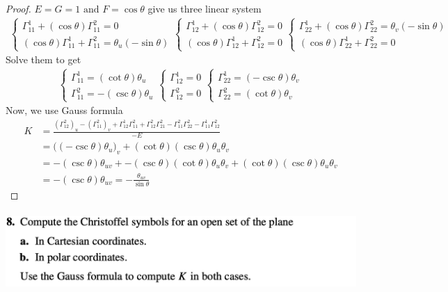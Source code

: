 \documentclass{report}
\begin{document}
\begin{proof}
$E=G=1\text{ and }F=\cos \theta$ give us three linear system 
\begin{align*}
\begin{cases}
  \Gamma^1_{11}+ (\cos \theta) \Gamma^2_{11}=0\\
  (\cos \theta) \Gamma^1_{11} + \Gamma^2_{11}= \theta_u (- \sin \theta)
\end{cases} \begin{cases}
  \Gamma^1_{12}+ (\cos \theta) \Gamma^2_{12}=0 \\
  (\cos \theta) \Gamma^1_{12}+ \Gamma^2_{12}= 0
\end{cases} \begin{cases}
 \Gamma^1_{22}+ (\cos \theta) \Gamma^2_{22}= \theta _v (-\sin \theta)  \\
 (\cos \theta)\Gamma^1_{22} + \Gamma^2_{22}=0
\end{cases}
\end{align*}
Solve them to get 
\begin{align*}
\begin{cases}
  \Gamma^1_{11}= (\cot \theta)\theta_u \\
  \Gamma^2_{11}=- (\csc \theta)\theta_u
\end{cases} \begin{cases}
  \Gamma^1_{12}=0\\
  \Gamma^2_{12}=0
\end{cases} \begin{cases}
  \Gamma^1_{22}= (- \csc \theta)\theta _v\\
  \Gamma^2_{22}=(\cot \theta )\theta_v
\end{cases}
\end{align*}
Now, we use Gauss formula 
\begin{align*}
K&= \frac{(\Gamma ^2_{12})_u - (\Gamma^2_{11})_v + \Gamma^1_{12} \Gamma^2_{11} + \Gamma^2_{12}\Gamma^2_{21}- \Gamma^2_{11}\Gamma^2_{22}-\Gamma^1_{11}\Gamma^2_{12}}{-E}\\
&= \big((-\csc \theta)\theta_u\big)_v + (\cot  \theta )(\csc \theta) \theta_u \theta_v\\
&= -(\csc \theta) \theta_{uv} + - (\csc \theta)(\cot \theta) \theta_u \theta_v + (\cot \theta)(\csc \theta)\theta_u \theta_v  \\
&= - (\csc \theta) \theta_{uv}= -\frac{\theta_{uv}}{\sin \theta}
\end{align*}
\end{proof}
\begin{question}{}{}
\includegraphics[height=3cm,width=18cm]{hw611}
\end{question}
\end{document}
